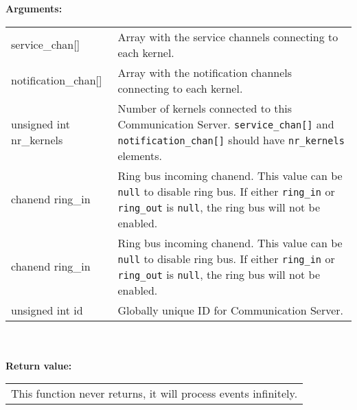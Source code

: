 \noindent
\textbf{Arguments:}\\
\indent\begin{tabular}{ p{4.5cm}  p{9cm} }
service\_chan[]      & Array with the service channels connecting 
                       to each kernel.\\
notification\_chan[] & Array with the notification channels connecting
                       to each kernel.\\
unsigned int
nr\_kernels          & Number of kernels connected to this Communication Server.
                       \verb|service_chan[]| and \verb|notification_chan[]|
                       should have \verb|nr_kernels| elements.\\
chanend
ring\_in             & Ring bus incoming chanend. This value can be \verb|null|
                       to disable ring bus. If either \verb|ring_in| 
                       or \verb|ring_out| is \verb|null|,
                       the ring bus will not be enabled.\\
chanend
ring\_in             & Ring bus incoming chanend. This value can be \verb|null|
                       to disable ring bus. If either \verb|ring_in| 
                       or \verb|ring_out| is \verb|null|,
                       the ring bus will not be enabled.\\
unsigned int id      & Globally unique ID for Communication Server.
\end{tabular}\\\\

\noindent
\textbf{Return value:}\\
\indent\begin{tabular}{  p{13.5cm} }
This function never returns, it will process events infinitely.
\end{tabular}

